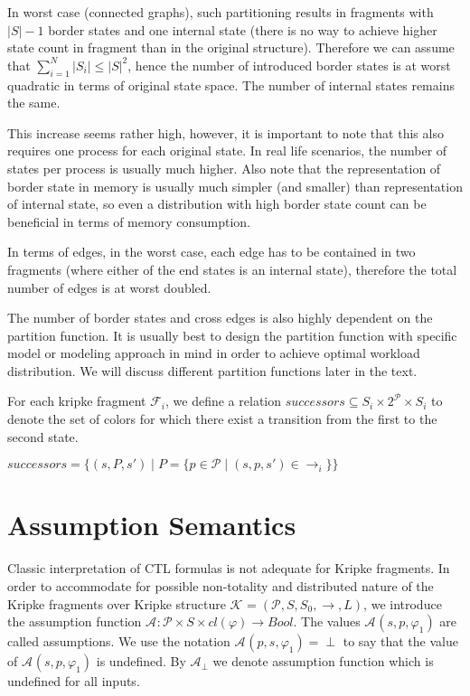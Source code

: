 \documentclass[12pt,oneside,draft]{fithesis2}
\newcommand{\as}[1][]{\ensuremath{\mathcal{A}_{#1}}}
\newcommand{\asemt}{\as[\perp]}
\newcommand{\ks}[1][]{\ensuremath{\mathcal{K}_{#1}}}
\newcommand{\kf}[2]{\ensuremath{\mathcal{F}^{#2}_{#1}}}
\newcommand{\fullKs}{\ensuremath{ \ks = (\params, S, S_0, \trans{}, L) }}
\newcommand{\trans}[1]{\stackrel{#1}{\rightarrow}}
\newcommand{\params}{\mathcal{P}}
\begin{document}
			In worst case (connected graphs), such partitioning results in fragments with $|S| - 1$ border states and one internal state (there is no way to achieve higher state count in fragment than in the original structure). Therefore we can assume that $\sum\limits_{i=1}^N | S_i | \leq |S|^2 $, hence the number of introduced border states is at worst quadratic in terms of original state space. The number of internal states remains the same.

			This increase seems rather high, however, it is important to note that this also requires one process for each original state. In real life scenarios, the number of states per process is usually much higher. Also note that the representation of border state in memory is usually much simpler (and smaller) than representation of internal state, so even a distribution with high border state count can be beneficial in terms of memory consumption. 
						
			In terms of edges, in the worst case, each edge has to be contained in two fragments (where either of the end states is an internal state), therefore the total number of edges is at worst doubled.			
			
			The number of border states and cross edges is also highly dependent on the partition function. It is usually best to design the partition function with specific model or modeling approach in mind in order to achieve optimal workload distribution. We will discuss different partition functions later in the text. 
			
			For each kripke fragment $\kf{i}{}$, we define a relation $successors \subseteq S_{i} \times 2^\params \times S_{i} $ to denote the set of colors for which there exist a transition from the first to the second state.
			
			\begin{center}
				$successors = \{(s, P, s') \mid P = \{p \in \params \mid (s, p, s') \in \trans{}_{i} \}\} $
			\end{center}
			
		\section{Assumption Semantics}
		
			Classic interpretation of CTL formulas is not adequate for Kripke fragments. In order to accommodate for possible non-totality and distributed nature of the Kripke fragments over Kripke structure $\fullKs$, we introduce the assumption function $\as : \params \times S \times cl(\varphi) \rightarrow Bool $. The values $\as(s, p, \varphi_1)$ are called assumptions. We use the notation $\as(p, s, \varphi_1) = \perp $ to say that the value of $\as(s, p, \varphi_1)$ is undefined. By $\asemt$ we denote assumption function which is undefined for all inputs.
			
\end{document}
